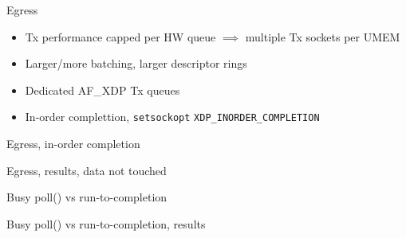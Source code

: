 \documentclass{beamer}
\begin{document}
  \begin{frame}{Egress}
    \begin{itemize}
    \item Tx performance capped per HW queue $\implies$ multiple Tx
      sockets per UMEM
    \item Larger/more batching, larger descriptor rings
    \item Dedicated AF\_XDP Tx queues
    \item In-order complettion, {\tt setsockopt} {\tt XDP\_INORDER\_COMPLETION}
    \end{itemize}
  \end{frame}
  \begin{frame}{Egress, in-order completion}
    \resizebox{\textwidth}{!}{}
  \end{frame}
  \begin{frame}{Egress, results, data not touched}
  \end{frame}

  \begin{frame}{Busy poll() vs run-to-completion}
    \resizebox{\textwidth}{!}{}
  \end{frame}
  \begin{frame}{Busy poll() vs run-to-completion, results}
  \end{frame}
\end{document}
